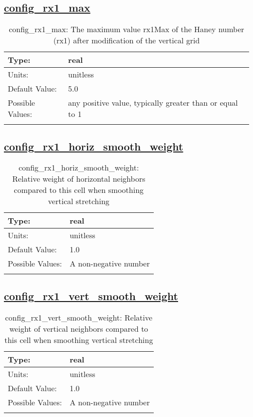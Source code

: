 \subsection[config\_rx1\_max]{\hyperref[sec:nm_tab_constrain_Haney_number]{config\_rx1\_max}}
\label{subsec:nm_sec_config_rx1_max}
\begin{center}
\begin{longtable}{| p{2.0in} || p{4.0in} |}
    \hline
    Type: & real \\
    \hline
    Units: & \si{unitless} \\
    \hline
    Default Value: & 5.0 \\
    \hline
    Possible Values: & any positive value, typically greater than or equal to 1 \\
    \hline
    \caption{config\_rx1\_max: The maximum value rx1Max of the Haney number (rx1) after modification of the vertical grid}
\end{longtable}
\end{center}
\subsection[config\_rx1\_horiz\_smooth\_weight]{\hyperref[sec:nm_tab_constrain_Haney_number]{config\_rx1\_horiz\_smooth\_weight}}
\label{subsec:nm_sec_config_rx1_horiz_smooth_weight}
\begin{center}
\begin{longtable}{| p{2.0in} || p{4.0in} |}
    \hline
    Type: & real \\
    \hline
    Units: & \si{unitless} \\
    \hline
    Default Value: & 1.0 \\
    \hline
    Possible Values: & A non-negative number \\
    \hline
    \caption{config\_rx1\_horiz\_smooth\_weight: Relative weight of horizontal neighbors compared to this cell when smoothing vertical stretching}
\end{longtable}
\end{center}
\subsection[config\_rx1\_vert\_smooth\_weight]{\hyperref[sec:nm_tab_constrain_Haney_number]{config\_rx1\_vert\_smooth\_weight}}
\label{subsec:nm_sec_config_rx1_vert_smooth_weight}
\begin{center}
\begin{longtable}{| p{2.0in} || p{4.0in} |}
    \hline
    Type: & real \\
    \hline
    Units: & \si{unitless} \\
    \hline
    Default Value: & 1.0 \\
    \hline
    Possible Values: & A non-negative number \\
    \hline
    \caption{config\_rx1\_vert\_smooth\_weight: Relative weight of vertical neighbors compared to this cell when smoothing vertical stretching}
\end{longtable}
\end{center}
